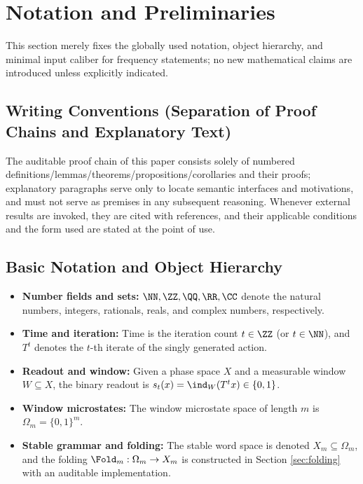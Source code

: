 \section{Notation and Preliminaries}\label{sec:preliminaries}

This section merely fixes the globally used notation, object hierarchy, and minimal input caliber for frequency statements; no new mathematical claims are introduced unless explicitly indicated.

\subsection{Writing Conventions (Separation of Proof Chains and Explanatory Text)}\label{subsec:writing-conventions}
The auditable proof chain of this paper consists solely of numbered definitions/lemmas/theorems/propositions/corollaries and their proofs; explanatory paragraphs serve only to locate semantic interfaces and motivations, and must not serve as premises in any subsequent reasoning. Whenever external results are invoked, they are cited with references, and their applicable conditions and the form used are stated at the point of use.

\subsection{Basic Notation and Object Hierarchy}
\begin{itemize}
  \item \textbf{Number fields and sets:} \(\NN,\ZZ,\QQ,\RR,\CC\) denote the natural numbers, integers, rationals, reals, and complex numbers, respectively.
  \item \textbf{Time and iteration:} Time is the iteration count \(t\in\ZZ\) (or \(t\in\NN\)), and \(T^t\) denotes the \(t\)-th iterate of the singly generated action.
  \item \textbf{Readout and window:} Given a phase space \(X\) and a measurable window \(W\subseteq X\), the binary readout is \(s_t(x)=\ind_W(T^t x)\in\{0,1\}\).
  \item \textbf{Window microstates:} The window microstate space of length \(m\) is \(\Omega_m=\{0,1\}^m\).
  \item \textbf{Stable grammar and folding:} The stable word space is denoted \(X_m\subseteq\Omega_m\), and the folding \(\Fold_m:\Omega_m\to X_m\) is constructed in Section \ref{sec:folding} with an auditable implementation.
\end{itemize}

